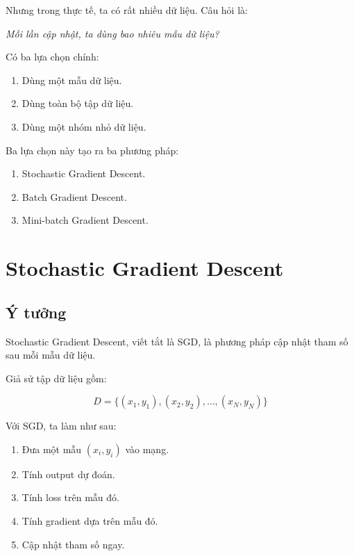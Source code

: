 \documentclass[12pt,a4paper]{report}
\begin{document}
Nhưng trong thực tế, ta có rất nhiều dữ liệu. Câu hỏi là:

\begin{center}
\textit{Mỗi lần cập nhật, ta dùng bao nhiêu mẫu dữ liệu?}
\end{center}

Có ba lựa chọn chính:

\begin{enumerate}
    \item Dùng một mẫu dữ liệu.
    \item Dùng toàn bộ tập dữ liệu.
    \item Dùng một nhóm nhỏ dữ liệu.
\end{enumerate}

Ba lựa chọn này tạo ra ba phương pháp:

\begin{enumerate}
    \item Stochastic Gradient Descent.
    \item Batch Gradient Descent.
    \item Mini-batch Gradient Descent.
\end{enumerate}

\chapter{Stochastic Gradient Descent}

\section{Ý tưởng}

Stochastic Gradient Descent, viết tắt là SGD, là phương pháp cập nhật tham số sau mỗi mẫu dữ liệu.

Giả sử tập dữ liệu gồm:

\[
    D=\{(x_1,y_1),(x_2,y_2),\ldots,(x_N,y_N)\}
\]

Với SGD, ta làm như sau:

\begin{enumerate}
    \item Đưa một mẫu $(x_i,y_i)$ vào mạng.
    \item Tính output dự đoán.
    \item Tính loss trên mẫu đó.
    \item Tính gradient dựa trên mẫu đó.
    \item Cập nhật tham số ngay.
\end{enumerate}
\end{document}
